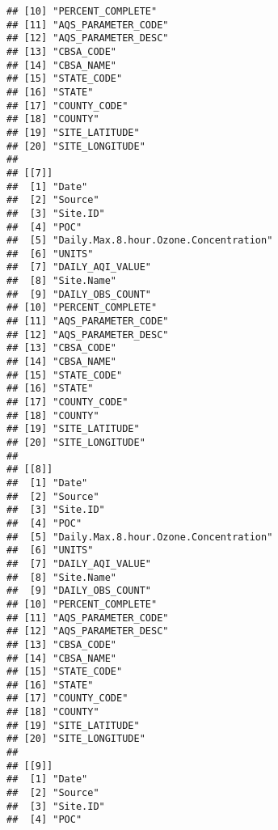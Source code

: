 \documentclass[]{article}
\begin{document}
\begin{verbatim}
## [10] "PERCENT_COMPLETE"                    
## [11] "AQS_PARAMETER_CODE"                  
## [12] "AQS_PARAMETER_DESC"                  
## [13] "CBSA_CODE"                           
## [14] "CBSA_NAME"                           
## [15] "STATE_CODE"                          
## [16] "STATE"                               
## [17] "COUNTY_CODE"                         
## [18] "COUNTY"                              
## [19] "SITE_LATITUDE"                       
## [20] "SITE_LONGITUDE"                      
## 
## [[7]]
##  [1] "Date"                                
##  [2] "Source"                              
##  [3] "Site.ID"                             
##  [4] "POC"                                 
##  [5] "Daily.Max.8.hour.Ozone.Concentration"
##  [6] "UNITS"                               
##  [7] "DAILY_AQI_VALUE"                     
##  [8] "Site.Name"                           
##  [9] "DAILY_OBS_COUNT"                     
## [10] "PERCENT_COMPLETE"                    
## [11] "AQS_PARAMETER_CODE"                  
## [12] "AQS_PARAMETER_DESC"                  
## [13] "CBSA_CODE"                           
## [14] "CBSA_NAME"                           
## [15] "STATE_CODE"                          
## [16] "STATE"                               
## [17] "COUNTY_CODE"                         
## [18] "COUNTY"                              
## [19] "SITE_LATITUDE"                       
## [20] "SITE_LONGITUDE"                      
## 
## [[8]]
##  [1] "Date"                                
##  [2] "Source"                              
##  [3] "Site.ID"                             
##  [4] "POC"                                 
##  [5] "Daily.Max.8.hour.Ozone.Concentration"
##  [6] "UNITS"                               
##  [7] "DAILY_AQI_VALUE"                     
##  [8] "Site.Name"                           
##  [9] "DAILY_OBS_COUNT"                     
## [10] "PERCENT_COMPLETE"                    
## [11] "AQS_PARAMETER_CODE"                  
## [12] "AQS_PARAMETER_DESC"                  
## [13] "CBSA_CODE"                           
## [14] "CBSA_NAME"                           
## [15] "STATE_CODE"                          
## [16] "STATE"                               
## [17] "COUNTY_CODE"                         
## [18] "COUNTY"                              
## [19] "SITE_LATITUDE"                       
## [20] "SITE_LONGITUDE"                      
## 
## [[9]]
##  [1] "Date"                                
##  [2] "Source"                              
##  [3] "Site.ID"                             
##  [4] "POC"                                 

\end{verbatim}
\end{document}

